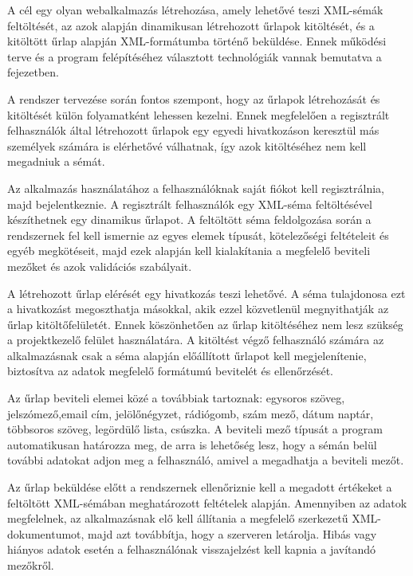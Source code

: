 
A cél egy olyan webalkalmazás létrehozása, amely lehetővé teszi XML-sémák feltöltését, az azok alapján dinamikusan létrehozott űrlapok kitöltését, és a kitöltött űrlap alapján XML-formátumba történő beküldése. Ennek működési terve és a program felépítéséhez választott technológiák vannak bemutatva a fejezetben.

A rendszer tervezése során fontos szempont, hogy az űrlapok létrehozását és kitöltését külön folyamatként lehessen kezelni. Ennek megfelelően a regisztrált felhasználók által létrehozott űrlapok egy egyedi hivatkozáson keresztül más személyek számára is elérhetővé válhatnak, így azok kitöltéséhez nem kell megadniuk a sémát.

Az alkalmazás használatához a felhasználóknak saját fiókot kell regisztrálnia, majd bejelentkeznie. A regisztrált felhasználók egy XML-séma feltöltésével készíthetnek egy dinamikus űrlapot. A feltöltött séma feldolgozása során a rendszernek fel kell ismernie az egyes elemek típusát, kötelezőségi feltételeit és egyéb megkötéseit, majd ezek alapján kell kialakítania a megfelelő beviteli mezőket és azok validációs szabályait.

A létrehozott űrlap elérését egy hivatkozás teszi lehetővé. A séma tulajdonosa ezt a hivatkozást megoszthatja másokkal, akik ezzel közvetlenül megnyithatják az űrlap kitöltőfelületét. Ennek köszönhetően az űrlap kitöltéséhez nem lesz szükség a projektkezelő felület használatára. A kitöltést végző felhasználó számára az alkalmazásnak csak a séma alapján előállított űrlapot kell megjelenítenie, biztosítva az adatok megfelelő formátumú bevitelét és ellenőrzését.

Az űrlap beviteli elemei közé a továbbiak tartoznak: egysoros szöveg, jelszómező,email cím, jelölőnégyzet, rádiógomb, szám mező, dátum naptár, többsoros szöveg, legördülő lista, csúszka. A beviteli mező típusát a program automatikusan határozza meg, de arra is lehetőség lesz, hogy a sémán belül további adatokat adjon meg a felhasználó, amivel a megadhatja a beviteli mezőt.

Az űrlap beküldése előtt a rendszernek ellenőriznie kell a megadott értékeket a feltöltött XML-sémában meghatározott feltételek alapján. Amennyiben az adatok megfelelnek, az alkalmazásnak elő kell állítania a megfelelő szerkezetű XML-dokumentumot, majd azt továbbítja, hogy a szerveren letárolja. Hibás vagy hiányos adatok esetén a felhasználónak visszajelzést kell kapnia a javítandó mezőkről.


